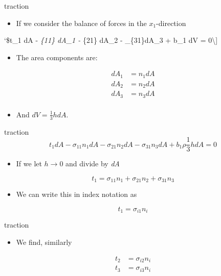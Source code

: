 \documentclass[
  letterpaper,
  ignorenonframetext,
  aspectratio=43,
  handout,
  12pt]{beamer}
\providecommand{\tightlist}{%
  \setlength{\itemsep}{0pt}\setlength{\parskip}{0pt}}
\providecommand{\tightlist}{%
\setlength{\itemsep}{0pt}\setlength{\parskip}{0pt}}
\begin{document}
\begin{frame}{traction}
\protect\hypertarget{traction-1}{}
\begin{itemize}
\tightlist
\item
  If we consider the balance of forces in the \(x_1\)-direction
\end{itemize}

`\$t\_1 dA - \sigma\emph{\{11\} dA\_1 - \sigma}\{21\} dA\_2 -
\sigma\_\{31\}dA\_3 + b\_1 \rho dV = 0\textbackslash{]}

\begin{itemize}
\tightlist
\item
  The area components are:
\end{itemize}

\[\begin{aligned}
    dA_1 &= n_1 dA\\
    dA_2 &= n_2 dA\\
    dA_3 &= n_3 dA\\
\end{aligned}\]

\begin{itemize}
\tightlist
\item
  And \(dV = \frac{1}{3}h dA\).
\end{itemize}
\end{frame}

\begin{frame}{traction}
\protect\hypertarget{traction-2}{}
\[t_1 dA - \sigma_{11} n_1 dA - \sigma_{21} n_2 dA - \sigma_{31} n_3 dA + b_1 \rho \frac{1}{3}h dA = 0\]

\begin{itemize}
\tightlist
\item
  If we let \(h \to 0\) and divide by \emph{dA}
\end{itemize}

\[t_1 = \sigma_{11}n_1 + \sigma_{21}n_2 + \sigma_{31}n_3\]

\begin{itemize}
\tightlist
\item
  We can write this in index notation as
\end{itemize}

\[t_1 = \sigma_{i1}n_i\]
\end{frame}

\begin{frame}{traction}
\protect\hypertarget{traction-3}{}
\begin{itemize}
\tightlist
\item
  We find, similarly
\end{itemize}

\[\begin{aligned}
    t_2 &= \sigma_{i2} n_i\\
    t_3 &= \sigma_{i3} n_i\\
\end{aligned}\]
\end{frame}
\end{document}
